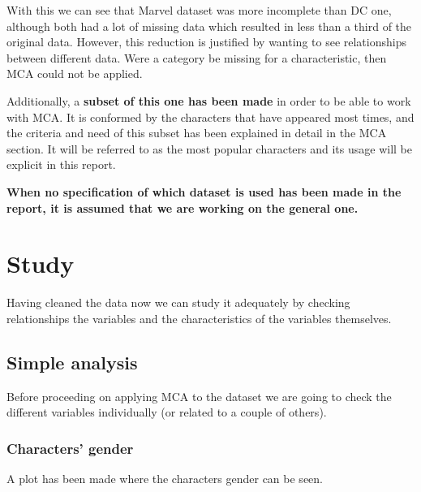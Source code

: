 With this we can see that Marvel dataset was more incomplete than DC one, although both had a lot of missing data which resulted in less than a third of the original data. However, this reduction is justified by wanting to see relationships between different data. Were a category be missing for a characteristic, then MCA could not be applied.


Additionally, a\textbf{ subset of this one has been made} in order to be able to work with MCA. It is conformed by the characters that have appeared most times, and the criteria and need of this subset has been explained in detail in the MCA section. It will be referred to as the most popular characters and its usage will be explicit in this report. 

\textbf{When no specification of which dataset is used has been made in the report, it is assumed that we are working on the general one.}


\newpage
\section{Study}
Having cleaned the data now we can study it adequately by checking relationships the variables and the characteristics of the variables themselves.

\subsection{Simple analysis}
Before proceeding on applying MCA to the dataset we are going to check the different variables individually (or related to a couple of others).

\subsubsection{Characters' gender}
A plot has been made where the characters gender can be seen.

